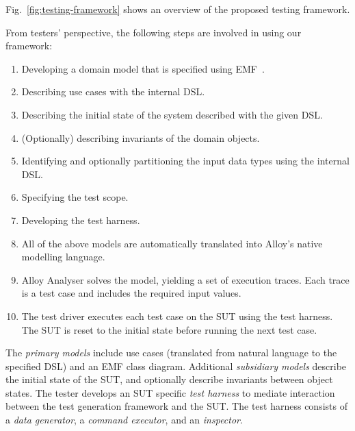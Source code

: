 %
%
\label{sec:framework-overview}
Fig.~\ref{fig:testing-framework} shows an overview of the proposed testing framework.

From testers' perspective, the following steps are involved in using our framework:
\begin{enumerate}
	\item Developing a domain model that is specified using EMF~\cite{EMF}. 
	
	\item Describing use cases with the internal DSL.
	
	\item Describing the initial state of the system described with the given DSL.
	
	\item (Optionally) describing invariants of the domain objects.
	
	\item Identifying and optionally partitioning the input data types using the internal DSL. 
	
	\item Specifying the test scope.
	
	\item Developing the test harness.
	
	\item All of the above models are automatically translated into Alloy's native modelling language.
	
	\item Alloy Analyser solves the model, yielding a set of execution traces. Each trace is a test case and includes the required input values.
	
	\item The test driver executes each test case on the SUT using the test harness. The SUT is reset to the initial state before running the next test case.
\end{enumerate}


The \textit{primary models} include use cases (translated from natural language to the specified DSL) and an EMF class diagram.
Additional \textit{subsidiary models} describe the initial state of the SUT, and optionally describe invariants between object states.
The tester develops an SUT specific \textit{test harness} to mediate interaction between the test generation framework and the SUT. The test harness consists of a \textit{data generator}, a \textit{command executor}, and an \textit{inspector}. %


